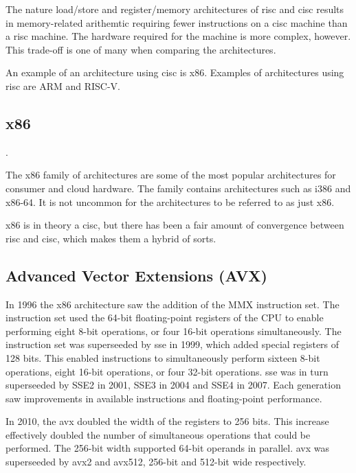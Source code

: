 The nature load/store and register/memory architectures of \gls{risc} and \gls{cisc} results in memory-related arithemtic requiring fewer instructions on a \gls{cisc} machine than a \gls{risc} machine. The hardware required for the machine is more complex, however. This trade-off is one of many when comparing the architectures\cite{carter2002}.

An example of an architecture using \gls{cisc} is \gls{x86}. Examples of architectures using \gls{risc} are ARM and RISC-V.

\subsection{x86}

.


The \gls{x86} family of architectures are some of the most popular architectures for consumer and cloud hardware. The family contains architectures such as i386 and x86-64. It is not uncommon for the architectures to be referred to as just \gls{x86}\cite{carter2002}.

\gls{x86} is in theory a \gls{cisc}, but there has been a fair amount of convergence between \gls{risc} and \gls{cisc}, which makes them a hybrid of sorts\cite{carter2002}.

\subsection{Advanced Vector Extensions (AVX)}

In 1996 the x86 architecture saw the addition of the MMX instruction set. The instruction set used the 64-bit floating-point registers of the CPU to enable performing eight 8-bit operations, or four 16-bit operations simultaneously. The instruction set was superseeded by \gls{sse} in 1999, which added special registers of 128 bits. This enabled instructions to simultaneously perform sixteen 8-bit operations, eight 16-bit operations, or four 32-bit operations. \gls{sse} was in turn superseeded by SSE2 in 2001, SSE3 in 2004 and SSE4 in 2007. Each generation saw improvements in available instructions and floating-point performance\cite{hennessy2011:avx}.

In 2010, the \gls{avx} doubled the width of the registers to 256 bits. This increase effectively doubled the number of simultaneous operations that could be performed. The 256-bit width supported 64-bit operands in parallel\cite{hennessy2011:avx}. \gls{avx} was superseeded by \gls{avx2} and \gls{avx512}, 256-bit\cite{intel:avx2} and 512-bit\cite{intel:avx512} wide respectively.


